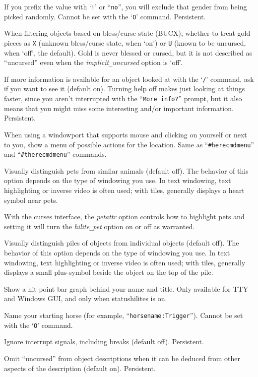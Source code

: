 If you prefix the value with `{\tt !}' or ``{\tt no}'', you will
exclude that gender from being picked randomly.
Cannot be set with the `{\tt O}' command.  Persistent.
\item[\ib{goldX}]
When filtering objects based on bless/curse state (BUCX), whether to
treat gold pieces as {\tt X} (unknown bless/curse state, when `on')
or {\tt U} (known to be uncursed, when `off', the default).
Gold is never blessed or cursed, but it is not described as ``uncursed''
even when the {\it implicit\verb+_+uncursed\/} option is `off'.
\item[\ib{help}]
If more information is available for an object looked at
with the `{\tt /}' command, ask if you want to see it (default on).
Turning help off makes just looking at things faster, since you aren't
interrupted with the ``{\tt More info?}'' prompt, but it also means that you
might miss some interesting and/or important information.  Persistent.
\item[\ib{herecmd\verb+_+menu}]
When using a windowport that supports mouse and clicking on yourself or
next to you, show a menu of possible actions for the location.
Same as ``{\tt \#herecmdmenu}'' and ``{\tt \#therecmdmenu}'' commands.
\item[\ib{hilite\verb+_+pet}]
Visually distinguish pets from similar animals (default off).
The behavior of this option depends on the type of windowing you use.
In text windowing, text highlighting or inverse video is often used;
with tiles, generally displays a heart symbol near pets.

With the curses interface, the {\it petattr\/}
option controls how to highlight pets and setting it will turn the
{\it hilite\verb+_+pet\/} option on or off as warranted.
\item[\ib{hilite\verb+_+pile}]
Visually distinguish piles of objects from individual objects (default off).
The behavior of this option depends on the type of windowing you use.
In text windowing, text highlighting or inverse video is often used;
with tiles, generally displays a small plus-symbol beside the object
on the top of the pile.
\item[\ib{hitpointbar}]
Show a hit point bar graph behind your name and title.
Only available for TTY and Windows GUI, and only when statushilites is on.
\item[\ib{horsename}]
Name your starting horse (for example, ``{\tt horsename:Trigger}'').
Cannot be set with the `{\tt O}' command.
\item[\ib{ignintr}]
Ignore interrupt signals, including breaks (default off).  Persistent.
\item[\ib{implicit\verb+_+uncursed}]
Omit ``uncursed'' from object descriptions when it can be deduced from
other aspects of the description (default on).
Persistent.

